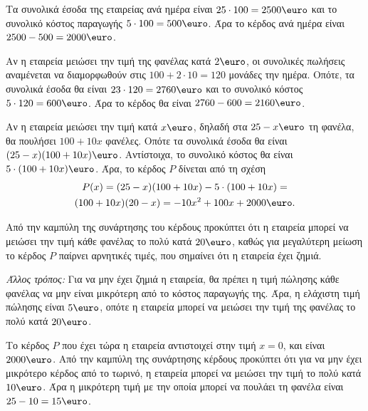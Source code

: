 
\begin{alist}
\item Τα συνολικά έσοδα της εταιρείας ανά ημέρα είναι $25 \cdot 100 = 2500\text{\euro}$ και το συνολικό κόστος παραγωγής $5 \cdot 100 = 500\text{\euro}$. Άρα το κέρδος ανά ημέρα είναι $2500 - 500 = 2000\text{\euro}$.

\item Αν η εταιρεία μειώσει την τιμή της φανέλας κατά $2\text{\euro}$, οι συνολικές πωλήσεις αναμένεται να διαμορφωθούν στις $100 + 2 \cdot 10 = 120$ μονάδες την ημέρα. Οπότε, τα συνολικά έσοδα θα είναι $23 \cdot 120 = 2760\text{\euro}$ και το συνολικό κόστος $5 \cdot 120 = 600\text{\euro}$. Άρα το κέρδος θα είναι $2760 - 600 = 2160\text{\euro}$.

\item Αν η εταιρεία μειώσει την τιμή κατά $x\text{\euro}$, δηλαδή στα $25 - x\text{\euro}$ τη φανέλα, θα πουλήσει $100 + 10x$ φανέλες. Οπότε τα συνολικά έσοδα θα είναι $(25 - x)(100 + 10x)\text{\euro}$. Αντίστοιχα, το συνολικό κόστος θα είναι $5 \cdot (100 + 10x)\text{\euro}$. Άρα, το κέρδος $P$ δίνεται από τη σχέση
\begin{gather*}
P(x) = (25 - x)(100 + 10x) - 5 \cdot (100 + 10x) = \\
(100 + 10x)(20 - x) = -10x^2 + 100x + 2000\text{\euro}.
\end{gather*}

\item
\begin{rlist}
\item Από την καμπύλη της συνάρτησης του κέρδους προκύπτει ότι η εταιρεία μπορεί να μειώσει την τιμή κάθε φανέλας το πολύ κατά $20\text{\euro}$, καθώς για μεγαλύτερη μείωση το κέρδος $P$ παίρνει αρνητικές τιμές, που σημαίνει ότι η εταιρεία έχει ζημιά.

\textit{Άλλος τρόπος:}
Για να μην έχει ζημιά η εταιρεία, θα πρέπει η τιμή πώλησης κάθε φανέλας να μην είναι μικρότερη από το κόστος παραγωγής της. Άρα, η ελάχιστη τιμή πώλησης είναι $5\text{\euro}$, οπότε η εταιρεία μπορεί να μειώσει την τιμή της φανέλας το πολύ κατά $20\text{\euro}$.

\item Το κέρδος $P$ που έχει τώρα η εταιρεία αντιστοιχεί στην τιμή $x = 0$, και είναι $2000\text{\euro}$.
Από την καμπύλη της συνάρτησης κέρδους προκύπτει ότι για να μην έχει μικρότερο κέρδος από το τωρινό, η εταιρεία μπορεί να μειώσει την τιμή το πολύ κατά $10\text{\euro}$.
Άρα η μικρότερη τιμή με την οποία μπορεί να πουλάει τη φανέλα είναι $25 - 10 = 15\text{\euro}$.
\end{rlist}
\end{alist}

